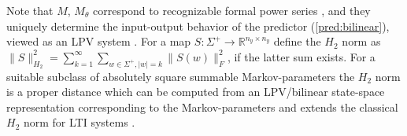 \documentclass{ifacconf}
\def\eqref#1{(\ref{#1})}
\begin{document}
  Note that $M$, $M_{\theta}$ correspond to recognizable formal power series \cite{Fliess,Son:Real},
  and they uniquely determine the input-output behavior of the predictor \eqref{pred:bilinear},  viewed as an LPV system \cite{Petreczky2016}. 
  For a map $S:\Sigma^{+} \rightarrow \mathbb{R}^{n_y \times n_y}$ define the $H_2$ norm as 
  $\|S\|_{H_2}^2 = \sum_{k=1}^{\infty} \sum_{w \in \Sigma^{+},|w|=k} \|S(w)\|_F^2$, if the latter sum exists.
  For a suitable subclass of absolutely square summable Markov-parameters the $H_2$ norm is a proper distance
  which can be computed from an LPV/bilinear state-space representation corresponding to the Markov-parameters
  and extends the classical $H_2$ norm for LTI systems \cite{BennerH2norm,HSCC2007,MTNSSpace}.

  
\end{document}
